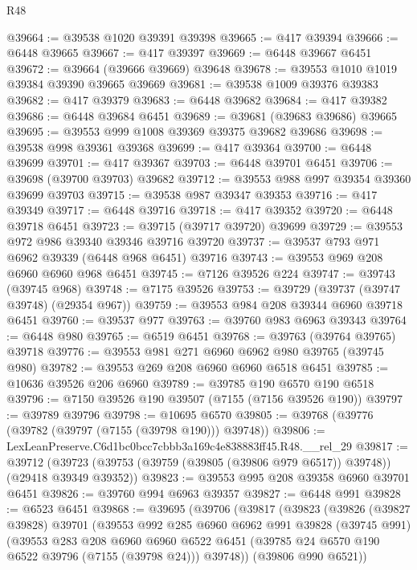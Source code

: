 \begin{lexlean}{R48}
\begin{coremodule}
@39664 := @39538 @1020 @39391 @39398
@39665 := @417 @39394
@39666 := @6448 @39665
@39667 := @417 @39397
@39669 := @6448 @39667 @6451
@39672 := @39664 (@39666 @39669) @39648
@39678 := @39553 @1010 @1019 @39384 @39390 @39665 @39669
@39681 := @39538 @1009 @39376 @39383
@39682 := @417 @39379
@39683 := @6448 @39682
@39684 := @417 @39382
@39686 := @6448 @39684 @6451
@39689 := @39681 (@39683 @39686) @39665
@39695 := @39553 @999 @1008 @39369 @39375 @39682 @39686
@39698 := @39538 @998 @39361 @39368
@39699 := @417 @39364
@39700 := @6448 @39699
@39701 := @417 @39367
@39703 := @6448 @39701 @6451
@39706 := @39698 (@39700 @39703) @39682
@39712 := @39553 @988 @997 @39354 @39360 @39699 @39703
@39715 := @39538 @987 @39347 @39353
@39716 := @417 @39349
@39717 := @6448 @39716
@39718 := @417 @39352
@39720 := @6448 @39718 @6451
@39723 := @39715 (@39717 @39720) @39699
@39729 := @39553 @972 @986 @39340 @39346 @39716 @39720
@39737 := @39537 @793 @971 @6962 @39339 (@6448 @968 @6451) @39716
@39743 := @39553 @969 @208 @6960 @6960 @968 @6451
@39745 := @7126 @39526 @224
@39747 := @39743 (@39745 @968)
@39748 := @7175 @39526
@39753 := @39729 (@39737 (@39747 @39748) (@29354 @967))
@39759 := @39553 @984 @208 @39344 @6960 @39718 @6451
@39760 := @39537 @977
@39763 := @39760 @983 @6963 @39343
@39764 := @6448 @980
@39765 := @6519 @6451
@39768 := @39763 (@39764 @39765) @39718
@39776 := @39553 @981 @271 @6960 @6962 @980 @39765 (@39745 @980)
@39782 := @39553 @269 @208 @6960 @6960 @6518 @6451
@39785 := @10636 @39526 @206 @6960
@39789 := @39785 @190 @6570 @190 @6518
@39796 := @7150 @39526 @190 @39507 (@7155 (@7156 @39526 @190))
@39797 := @39789 @39796
@39798 := @10695 @6570
@39805 := @39768 (@39776 (@39782 (@39797 (@7155 (@39798 @190))) @39748))
@39806 := LexLeanPreserve.C6d1bc0bcc7cbbb3a169c4e838883ff45.R48.__rel_29
@39817 := @39712
    (@39723 (@39753 (@39759 (@39805 (@39806 @979 @6517)) @39748)) (@29418 @39349 @39352))
@39823 := @39553 @995 @208 @39358 @6960 @39701 @6451
@39826 := @39760 @994 @6963 @39357
@39827 := @6448 @991
@39828 := @6523 @6451
@39868 := @39695
    (@39706
      (@39817
        (@39823
          (@39826
            (@39827 @39828)
            @39701
            (@39553
              @992
              @285
              @6960
              @6962
              @991
              @39828
              (@39745 @991)
              (@39553
                @283
                @208
                @6960
                @6960
                @6522
                @6451
                (@39785 @24 @6570 @190 @6522 @39796 (@7155 (@39798 @24)))
                @39748))
            (@39806 @990 @6521))

\end{coremodule}
\end{lexlean}
